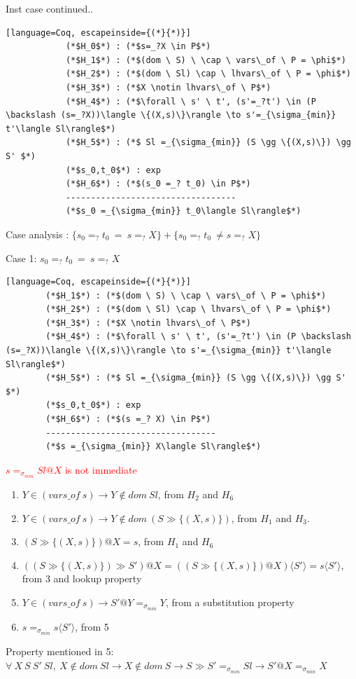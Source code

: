 \documentclass[10pt]{beamer}
\begin{document}
\begin{frame}[fragile]{}
	\begin{block}{Inst case continued.. }
		\begin{lstlisting}[language=Coq, escapeinside={(*}{*)}]
			(*$H_0$*) : (*$s=_?X \in P$*)
			(*$H_1$*) : (*$(dom \ S) \ \cap \ vars\_of \ P = \phi$*)
			(*$H_2$*) : (*$(dom \ Sl) \cap \ lhvars\_of \ P = \phi$*)
			(*$H_3$*) : (*$X \notin lhvars\_of \ P$*)
			(*$H_4$*) : (*$\forall \ s' \ t', (s'=_?t') \in (P \backslash (s=_?X))\langle \{(X,s)\}\rangle \to s'=_{\sigma_{min}} t'\langle Sl\rangle$*)
			(*$H_5$*) : (*$ Sl =_{\sigma_{min}} (S \gg \{(X,s)\}) \gg S' $*)
			(*$s_0,t_0$*) : exp
			(*$H_6$*) : (*$(s_0 =_? t_0) \in P$*)
			----------------------------------
			(*$s_0 =_{\sigma_{min}} t_0\langle Sl\rangle$*)
		\end{lstlisting}
	\end{block}
\pause

Case analysis : $\{s_0 =_? t_0 \ =  \ s =_? X\} + \{s_0 =_? t_0 \ \neq s =_? X\}$
\end{frame}

\begin{frame}[fragile]{}
	\begin{block}{Case 1: $s_0 =_? t_0 \ =  \ s =_? X$}
	\begin{lstlisting}[language=Coq, escapeinside={(*}{*)}]
		(*$H_1$*) : (*$(dom \ S) \ \cap \ vars\_of \ P = \phi$*)
		(*$H_2$*) : (*$(dom \ Sl) \cap \ lhvars\_of \ P = \phi$*)
		(*$H_3$*) : (*$X \notin lhvars\_of \ P$*)
		(*$H_4$*) : (*$\forall \ s' \ t', (s'=_?t') \in (P \backslash (s=_?X))\langle \{(X,s)\}\rangle \to s'=_{\sigma_{min}} t'\langle Sl\rangle$*)
		(*$H_5$*) : (*$ Sl =_{\sigma_{min}} (S \gg \{(X,s)\}) \gg S' $*)
		(*$s_0,t_0$*) : exp
		(*$H_6$*) : (*$(s =_? X) \in P$*)
		----------------------------------
		(*$s =_{\sigma_{min}} X\langle Sl\rangle$*)
	\end{lstlisting}
\end{block}
\pause
\textcolor{red}{$s =_{\sigma_{min}} Sl @ X$ is not immediate}
\begin{enumerate}
	\pause
		\item $Y \in (vars\_of \ s) \to Y \notin dom \ Sl$, from $H_2$ and $H_6$
		\pause
	\item $Y \in (vars\_of \ s) \to Y \notin dom \ (S \gg \{(X,s)\})$, from $H_1$ and $H_3$.
	\pause
	\item $(S \gg \{(X,s)\})@X = s$, from $H_1$ and $H_6$
	\pause
	\item $((S \gg \{(X,s)\}) \gg S')@X = ((S \gg \{(X,s)\})@X)\langle S'\rangle = s\langle S'\rangle$, from 3 and lookup property
	\pause
	\item $Y \in (vars\_of \ s) \to S'@Y =_{\sigma_{min}} Y$, from a substitution property
	\pause
	\item $s =_{\sigma_{min}} s\langle S'\rangle$, from 5
\end{enumerate}

\pause
Property mentioned in 5: 
$\forall \ X \ S \ S' \ Sl, \ X \notin dom \ Sl \to X \notin dom \ S \to S \gg S' =_{\sigma_{min}} Sl \to S'@X =_{\sigma_{min}}X$

\end{frame}
\end{document}
